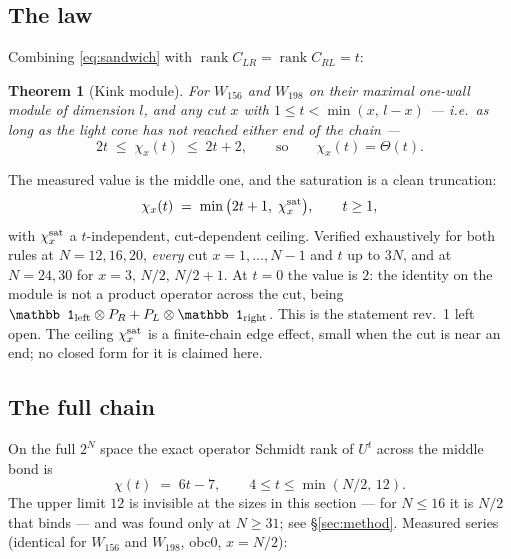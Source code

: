 \documentclass[11pt]{article}
\theoremstyle{plain}
\newtheorem{theorem}{Theorem}
\theoremstyle{remark}
\begin{document}
\subsection{The law}

Combining \eqref{eq:sandwich} with $\operatorname{rank}C_{LR}
= \operatorname{rank}C_{RL} = t$:

\begin{theorem}[Kink module]
\label{thm:tight}
For $W_{156}$ and $W_{198}$ on their maximal one-wall module of dimension $l$,
and any cut $x$ with $1\le t<\min(x,\,l-x)$ --- i.e.\ as long as the light cone
has not reached either end of the chain ---
\[
  2t \;\le\; \chi_x(t) \;\le\; 2t+2 ,
  \qquad\text{so}\qquad \chi_x(t) = \Theta(t).
\]
\end{theorem}

\noindent The measured value is the middle one, and the saturation is a clean
truncation:
\begin{equation}
  \chi_x(t) \;=\; \min\big(2t+1,\; \chi_x^{\rm sat}\big),
  \qquad t\ge1,
  \label{eq:exactmodule}
\end{equation}
with $\chi_x^{\rm sat}$ a $t$-independent, cut-dependent ceiling. Verified
exhaustively for both rules at $N=12,16,20$, \emph{every} cut $x=1,\dots,N-1$
and $t$ up to $3N$, and at $N=24,30$ for $x=3,\,N/2,\,N/2+1$. At $t=0$ the value
is $2$: the identity on the module is not a product operator across the cut,
being $\mathbb 1_{\rm left}\otimes P_R + P_L\otimes\mathbb 1_{\rm right}$. This
is the statement rev.\ 1 left open. The ceiling $\chi_x^{\rm sat}$ is a
finite-chain edge effect, small when the cut is near an end; no closed form for
it is claimed here.

\subsection{The full chain}

On the full $2^N$ space the exact operator Schmidt rank of $U^t$ across the
middle bond is
\begin{equation}
  \boxed{\;\chi(t) \;=\; 6t-7,\qquad 4\le t\le \min(N/2,\,12).\;}
  \label{eq:full}
\end{equation}
The upper limit $12$ is invisible at the sizes in this section --- for $N\le16$
it is $N/2$ that binds --- and was found only at $N\ge31$; see
\S\ref{sec:method}.
Measured series (identical for $W_{156}$ and $W_{198}$, obc0, $x=N/2$):
\end{document}
